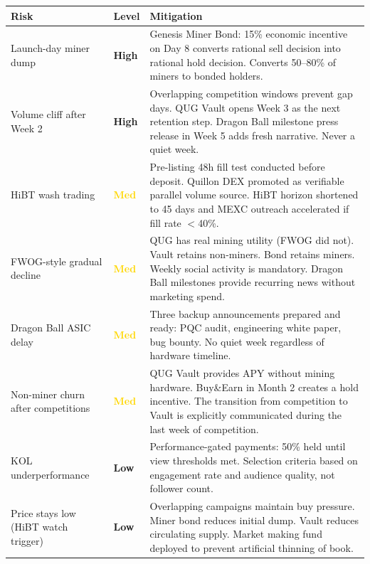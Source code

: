 \documentclass[11pt,a4paper]{article}
\begin{document}
\begin{center}
\begin{tabular}{L{4cm} C{1.5cm} L{8cm}}
  \toprule
  \textbf{Risk} & \textbf{Level} & \textbf{Mitigation} \\
  \midrule
  Launch-day miner dump & \textcolor{warning}{\textbf{High}} & Genesis Miner Bond: 15\% economic incentive on Day 8 converts rational sell decision into rational hold decision. Converts 50--80\% of miners to bonded holders. \\

  Volume cliff after Week 2 & \textcolor{warning}{\textbf{High}} & Overlapping competition windows prevent gap days. QUG Vault opens Week 3 as the next retention step. Dragon Ball milestone press release in Week 5 adds fresh narrative. Never a quiet week. \\

  HiBT wash trading & \textcolor{gold}{\textbf{Med}} & Pre-listing 48h fill test conducted before deposit. Quillon DEX promoted as verifiable parallel volume source. HiBT horizon shortened to 45 days and MEXC outreach accelerated if fill rate $<$40\%. \\

  FWOG-style gradual decline & \textcolor{gold}{\textbf{Med}} & QUG has real mining utility (FWOG did not). Vault retains non-miners. Bond retains miners. Weekly social activity is mandatory. Dragon Ball milestones provide recurring news without marketing spend. \\

  Dragon Ball ASIC delay & \textcolor{gold}{\textbf{Med}} & Three backup announcements prepared and ready: PQC audit, engineering white paper, bug bounty. No quiet week regardless of hardware timeline. \\

  Non-miner churn after competitions & \textcolor{gold}{\textbf{Med}} & QUG Vault provides APY without mining hardware. Buy\&Earn in Month 2 creates a hold incentive. The transition from competition to Vault is explicitly communicated during the last week of competition. \\

  KOL underperformance & \textcolor{quggreen}{\textbf{Low}} & Performance-gated payments: 50\% held until view thresholds met. Selection criteria based on engagement rate and audience quality, not follower count. \\

  Price stays low (HiBT watch trigger) & \textcolor{quggreen}{\textbf{Low}} & Overlapping campaigns maintain buy pressure. Miner bond reduces initial dump. Vault reduces circulating supply. Market making fund deployed to prevent artificial thinning of book. \\


\end{tabular}
\end{center}
\end{document}

